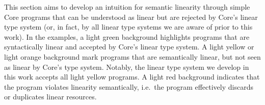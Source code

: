 \documentclass[acmsmall,review,anonymous,screen]{acmart}
\newcommand{\workingcolorname}{light green}
\newcommand{\notyetcolorname}{light yellow}
\newcommand{\nowaycolorname}{light red}
\newcommand{\limitationcolorname}{light orange}
\begin{document}
This section aims to develop an intuition for semantic linearity through simple
Core programs that can be understood as linear but are rejected by Core's
linear type system (or, in fact, by all linear type systems we are
aware of prior to this work).
%
%
%
In the examples, a \colorbox{working}{\workingcolorname} background highlights
programs that are syntactically linear and accepted by Core's linear type
system.
%
A \colorbox{notyet}{\notyetcolorname} or
\colorbox{limitation}{\limitationcolorname} background mark programs that are
semantically linear, but not seen as linear by Core's type system.
%
Notably, the linear type system we develop in this work accepts all
\colorbox{notyet}{\notyetcolorname} programs.
%
A \colorbox{noway}{\nowaycolorname} background indicates that the program
violates linearity semantically, i.e.~the program effectively
discards or duplicates linear resources.


\end{document}
